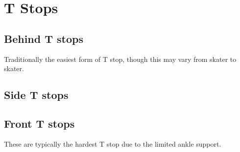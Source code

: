 \section{T Stops}
\label{sec:stopping/t_stops}

\subsection*{Behind T stops}
Traditionally the easiest form of T stop, though this may vary from skater to skater.


\subsection*{Side T stops}



\subsection*{Front T stops}
These are typically the hardest T stop due to the limited ankle support.


